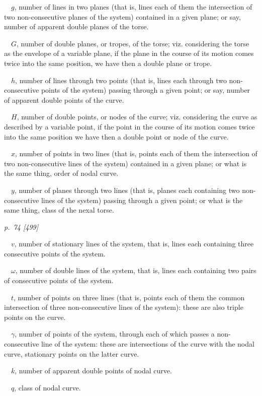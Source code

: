 \documentclass[11pt,a4paper]{article}
\newcommand{\pagemarker}[2]{\clearpage\noindent\textit{p.~#1 [#2]}\par\medskip}
\begin{document}
\(\quad g\), number of lines in two planes (that is, lines each of them the intersection
of two non-consecutive planes of the system) contained in a given plane; or say,
number of apparent double planes of the torse.

\(\quad G\), number of double planes, or tropes, of the torse; viz. considering the
torse as the envelope of a variable plane, if the plane in the course of its motion
comes twice into the same position, we have then a double plane or trope.

\(\quad h\), number of lines through two points (that is, lines each through two
non-consecutive points of the system) passing through a given point; or say, number
of apparent double points of the curve.

\(\quad H\), number of double points, or nodes of the curve; viz. considering the curve
as described by a variable point, if the point in the course of its motion comes twice
into the same position we have then a double point or node of the curve.

\(\quad x\), number of points in two lines (that is, points each of them the intersection
of two non-consecutive lines of the system) contained in a given plane; or what is
the same thing, order of nodal curve.

\(\quad y\), number of planes through two lines (that is, planes each containing two
non-consecutive lines of the system) passing through a given point; or what is the
same thing, class of the nexal torse.

\pagemarker{74}{499}
\(\quad v\), number of stationary lines of the system, that is, lines each containing
three consecutive points of the system.

\(\quad \omega\), number of double lines of the system, that is, lines each containing
two pairs of consecutive points of the system.

\(\quad t\), number of points on three lines (that is, points each of them the common
intersection of three non-consecutive lines of the system): these are also triple points
on the curve.

\(\quad \gamma\), number of points of the system, through each of which passes a
non-consecutive line of the system: these are intersections of the curve with the nodal
curve, stationary points on the latter curve.

\(\quad k\), number of apparent double points of nodal curve.

\(\quad q\), class of nodal curve.
\end{document}
